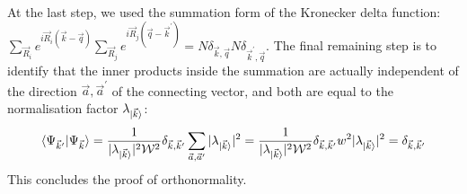 \documentclass{report}
\numberwithin{equation}{section}
\begin{document}
\begin{appendices}
\begin{equation}
\begin{aligned}
\end{aligned}\end{equation}
At the last step, we used the summation form of the Kronecker delta function: \(\sum_{\vec R_i}e^{i \vec R_i \left( \vec k - \vec q \right) }\sum_{\vec R_j}e^{i \vec R_j \left( \vec q - \vec k^\prime \right) } = N \delta_{\vec k,\vec q}N \delta_{\vec k^\prime,\vec q}\). The final remaining step is to identify that the inner products inside the summation are actually independent of the direction \(\vec a, \vec a^\prime\) of the connecting vector, and both are equal to the normalisation factor \(\lambda_{\ket{\vec k}}\):
\begin{equation}\begin{aligned}
	\braket{\Psi_{\vec k^\prime} | \Psi_{\vec k}} = \frac{1}{|\lambda_{\ket{\vec k}}|^2 \mathcal{W}^2 } \delta_{\vec k, \vec k^\prime}\sum_{\vec a,\vec a^\prime} |\lambda_{\ket{\vec k}}|^2 = \frac{1}{|\lambda_{\ket{\vec k}}|^2 \mathcal{W}^2 } \delta_{\vec k, \vec k^\prime}w^2 |\lambda_{\ket{\vec k}}|^2 = \delta_{\vec k, \vec k^\prime}
\end{aligned}\end{equation}
This concludes the proof of orthonormality.


\end{appendices}
\end{document}

